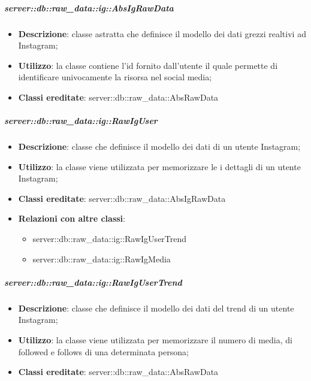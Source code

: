 		\subparagraph{server::db::raw\_data::ig::AbsIgRawData} %
		\label{subp:server_db_raw_data_ig_absigrawdata}
			\begin{itemize}
				\item \textbf{Descrizione}: classe astratta che definisce il modello dei dati grezzi realtivi ad Instagram;
				\item \textbf{Utilizzo}: la classe contiene l'id fornito dall'utente il quale permette di identificare univocamente la risorsa nel social media;
				\item \textbf{Classi ereditate}: server::db::raw\_data::AbsRawData
			\end{itemize}


		\subparagraph{server::db::raw\_data::ig::RawIgUser} %
		\label{subp:server_db_raw_data_ig_rawiguser}
			\begin{itemize}
				\item \textbf{Descrizione}: classe che definisce il modello dei dati di un utente Instagram;
				\item \textbf{Utilizzo}:  la classe viene utilizzata per memorizzare le i dettagli di un utente Instagram;
				\item \textbf{Classi ereditate}: server::db::raw\_data::AbsIgRawData
				\item \textbf{Relazioni con altre classi}:
					\begin{itemize}
						\item server::db::raw\_data::ig::RawIgUserTrend
						\item server::db::raw\_data::ig::RawIgMedia
					\end{itemize}
			\end{itemize}


		\subparagraph{server::db::raw\_data::ig::RawIgUserTrend} %
		\label{subp:server_db_raw_data_ig_rawigusertrend}
			\begin{itemize}
				\item \textbf{Descrizione}: classe che definisce il modello dei dati del trend di un utente Instagram;
				\item \textbf{Utilizzo}: la classe viene utilizzata per memorizzare il numero di media, di followed e follows di una determinata persona;
				\item \textbf{Classi ereditate}: server::db::raw\_data::AbsRawData
			\end{itemize}


